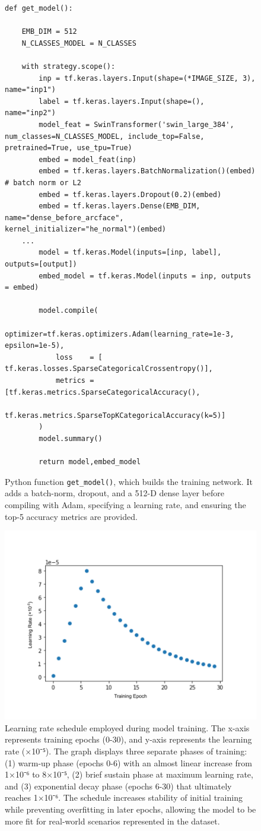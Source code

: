 \documentclass[twocolumn]{article}
\begin{document}
\begin{figure}[H]
\begin{minipage}{1.05\linewidth}
\begin{lstlisting}
def get_model():

    EMB_DIM = 512
    N_CLASSES_MODEL = N_CLASSES

    with strategy.scope():
        inp = tf.keras.layers.Input(shape=(*IMAGE_SIZE, 3), name="inp1")
        label = tf.keras.layers.Input(shape=(), name="inp2")
        model_feat = SwinTransformer('swin_large_384', num_classes=N_CLASSES_MODEL, include_top=False, pretrained=True, use_tpu=True)
        embed = model_feat(inp)
        embed = tf.keras.layers.BatchNormalization()(embed) # batch norm or L2
        embed = tf.keras.layers.Dropout(0.2)(embed)
        embed = tf.keras.layers.Dense(EMB_DIM, name="dense_before_arcface", kernel_initializer="he_normal")(embed)
    ...
        model = tf.keras.Model(inputs=[inp, label], outputs=[output])
        embed_model = tf.keras.Model(inputs = inp, outputs = embed)

        model.compile(
            optimizer=tf.keras.optimizers.Adam(learning_rate=1e-3, epsilon=1e-5),
            loss    = [ tf.keras.losses.SparseCategoricalCrossentropy()],
            metrics = [tf.keras.metrics.SparseCategoricalAccuracy(),
                       tf.keras.metrics.SparseTopKCategoricalAccuracy(k=5)]
        )
        model.summary()
        
        return model,embed_model
\end{lstlisting}
\end{minipage}
\caption{Python function \texttt{get_model()}, which builds the training network. It adds a batch-norm, dropout, and a 512-D dense layer before compiling with Adam, specifying a learning rate, and ensuring the top-5 accuracy metrics are provided.}
\end{figure}

\begin{figure}[H]
    \centering
    \includegraphics[width=0.5\linewidth]{learning.png}
    \caption{Learning rate schedule employed during model training. The x-axis represents training epochs (0-30), and y-axis represents the learning rate (×10⁻⁵). The graph displays three separate phases of training: (1) warm-up phase (epochs 0-6) with an almost linear increase from 1×10⁻⁶ to 8×10⁻⁵, (2) brief sustain phase at maximum learning rate, and (3) exponential decay phase (epochs 6-30) that ultimately reaches 1×10⁻⁶. The schedule increases stability of initial training while preventing overfitting in later epochs, allowing the model to be more fit for real-world scenarios represented in the dataset.}
\end{figure}
\end{document}
